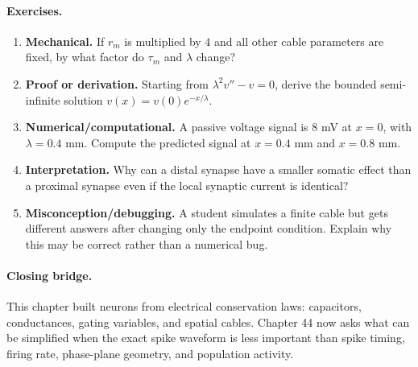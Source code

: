 \paragraph{Exercises.}
\begin{enumerate}[label=\textbf{43.4.\arabic*.}, leftmargin=*]
\item \textbf{Mechanical.} If \(r_m\) is multiplied by \(4\) and all other cable parameters are fixed, by what factor do \(\tau_m\) and \(\lambda\) change?
\item \textbf{Proof or derivation.} Starting from \(\lambda^2v''-v=0\), derive the bounded semi-infinite solution \(v(x)=v(0)e^{-x/\lambda}\).
\item \textbf{Numerical/computational.} A passive voltage signal is \(8\) mV at \(x=0\), with \(\lambda=0.4\) mm. Compute the predicted signal at \(x=0.4\) mm and \(x=0.8\) mm.
\item \textbf{Interpretation.} Why can a distal synapse have a smaller somatic effect than a proximal synapse even if the local synaptic current is identical?
\item \textbf{Misconception/debugging.} A student simulates a finite cable but gets different answers after changing only the endpoint condition. Explain why this may be correct rather than a numerical bug.
\end{enumerate}

\paragraph{Closing bridge.}
This chapter built neurons from electrical conservation laws: capacitors, conductances, gating variables, and spatial cables. Chapter 44 now asks what can be simplified when the exact spike waveform is less important than spike timing, firing rate, phase-plane geometry, and population activity.

\clearpage
